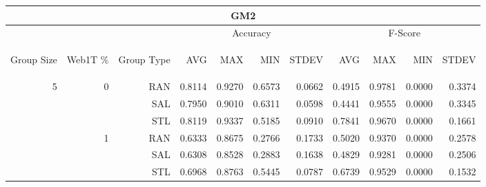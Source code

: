 \begin{center}
\begin{table}[htbp]
\begin{tabular}{ | r | r | r | r | r | r | r | r | r | r | r |}
\hline
\multicolumn{11}{|c|}{GM2}\\
\hline
 & & & \multicolumn{4}{|c|}{Accuracy} & \multicolumn{4}{|c|}{F-Score}\\ \cline{4-11}
\begin{sideways}Group Size\end{sideways} & \begin{sideways}Web1T \%\end{sideways} & \begin{sideways}Group Type\end{sideways} & \begin{sideways}AVG\end{sideways} & \begin{sideways}MAX\end{sideways} & \begin{sideways}MIN\end{sideways} & \begin{sideways}STDEV\end{sideways} & \begin{sideways}AVG\end{sideways} & \begin{sideways}MAX\end{sideways} & \begin{sideways}MIN\end{sideways} & \begin{sideways}STDEV\end{sideways}\\
\hline
\multirow{18}{*}{5}
 & \multirow{3}{*}{0} & RAN & 0.8114 & 0.9270 & 0.6573 & 0.0662 & 0.4915 & 0.9781 & 0.0000 & 0.3374\\ \cline{3-11}
 &   & SAL & 0.7950 & 0.9010 & 0.6311 & 0.0598 & 0.4441 & 0.9555 & 0.0000 & 0.3345\\ \cline{3-11}
 &   & STL & 0.8119 & 0.9337 & 0.5185 & 0.0910 & 0.7841 & 0.9670 & 0.0000 & 0.1661\\ \cline{2-11}
 & \multirow{3}{*}{1} & RAN & 0.6333 & 0.8675 & 0.2766 & 0.1733 & 0.5020 & 0.9370 & 0.0000 & 0.2578\\ \cline{3-11}
 &   & SAL & 0.6308 & 0.8528 & 0.2883 & 0.1638 & 0.4829 & 0.9281 & 0.0000 & 0.2506\\ \cline{3-11}
 &   & STL & 0.6968 & 0.8763 & 0.5445 & 0.0787 & 0.6739 & 0.9529 & 0.0000 & 0.1532\\ \cline{2-11}

\end{tabular}
\end{table}
\end{center}
